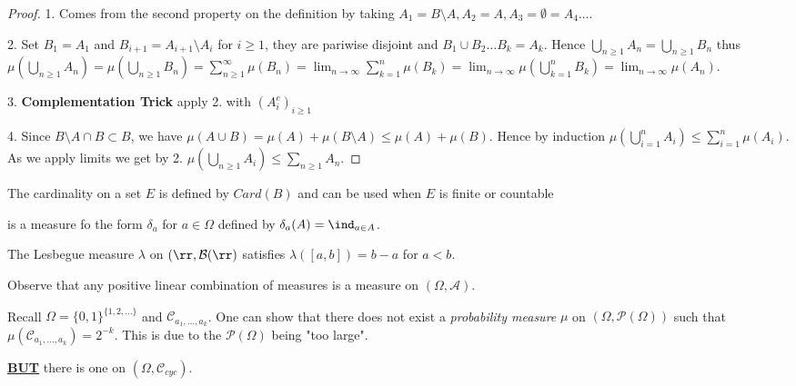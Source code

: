 \documentclass{scrartcl}
\begin{document}
  \begin{proof}

    1. Comes from the second property on the definition by taking $A_1 = B \setminus A, A_2 =
    A, A_3 = \emptyset = A_4 \ldots$.
    \vspace{0.5em}

    2. Set $B_1 = A_1$ and $B_{i + 1} = A_{i + 1} \setminus A_i$ for $i \geq 1$, they are
    pariwise disjoint and $B_1 \cup B_2 \ldots B_k = A_k$. Hence $\bigcup_{n \geq 1} A_n =
    \bigcup_{n \geq 1} B_n$ thus $\mu \left( \bigcup_{n \geq 1} A_n \right) = \mu \left(
    \bigcup_{n \geq 1} B_n \right) = \sum_{n \geq 1}^\infty \mu(B_n) = \lim_{n \to \infty}
    \sum_{k = 1}^n \mu(B_k) = \lim_{n \to \infty} \mu \left( \bigcup_{k = 1}^n B_k \right) =
    \lim_{n \to \infty} \mu(A_n) $.
    \vspace{0.5em}

    3. \textbf{Complementation Trick} apply 2. with $(A_i^c)_{i \geq 1}$ 
    \vspace{0.5em}

    4. Since $B\setminus A \cap B \subset B$, we have $\mu(A\cup B) = \mu(A) + \mu(B
    \setminus A) \leq \mu(A) + \mu(B)$. Hence by induction $\mu \left( \bigcup_{i =1}^n A_i
    \right) \leq \sum_{i=1}^n \mu(A_i)$. As we apply limits we get by 2. $\mu \left( \bigcup_{n
    \geq 1} A_i \right) \leq \sum_{n \geq 1}A_n $.
  \end{proof}


  \begin{example}
    The cardinality on a set $E$ is defined by
    $Card(B)$ and can be  used when $E$ is finite or countable
  \end{example}
  \begin{example}
    is a measure fo the form $\delta_a$ for $a \in \Omega$ defined by 
    $\delta_a(A) = \ind_{a \in A}$.
  \end{example}
  \begin{example}
    The Lesbegue measure $\lambda$ on $(\rr, \mathcal{B}(\rr)$ satisfies $\lambda([a, b]) = b
    - a$ for $a < b$. 
  \end{example} 

  Observe that any positive linear combination of measures is a measure on $(\Omega,
  \mathcal{A})$.

  \begin{remark}
    Recall $\Omega = \{ 0,1 \} ^{\{1, 2, \ldots\}}$ and $\mathcal{C}_{a_1, \ldots, a_k}$. One
    can show that there does not exist a \textit{probability measure} $\mu$ on $(\Omega,
    \mathcal{P}(\Omega))$ such that $\mu(\mathcal{C}_{a_1, \ldots, a_k}) = 2^{-k}$. This is due
    to the $\mathcal{P}(\Omega)$ being "too large".
    \vspace{0.3em}

    \underline{\textbf{BUT}} there is one on $(\Omega, \mathcal{C}_{cyc})$.
  \end{remark}
\end{document}
